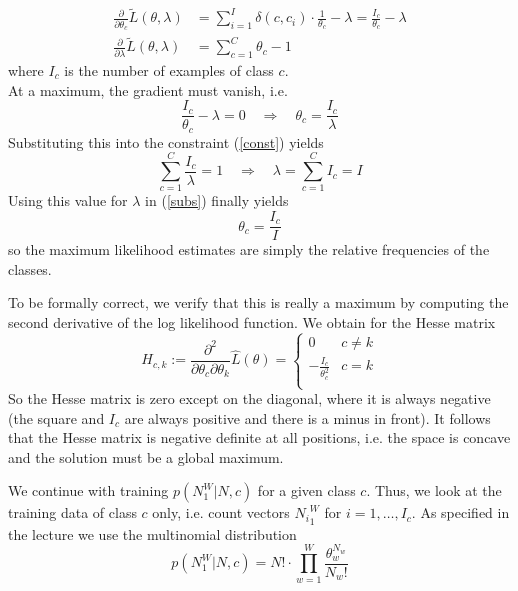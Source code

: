 \documentclass[%
   11pt,              %
   ngerman,           %
   a4paper,           %
   DIV11,             %
]{scrartcl}%
\begin{document}
\begin{align*}
	\frac{\partial}{\partial \theta_c} \tilde{L}(\theta, \lambda) &= \sum_{i=1}^I \delta(c,c_i) \cdot \frac{1}{\theta_c} - \lambda = \frac{I_c}{\theta_c} - \lambda \\
	\frac{\partial}{\partial \lambda} \tilde{L}(\theta, \lambda) &= \sum_{c=1}^C \theta_c - 1
\end{align*}
where $I_c$ is the number of examples of class $c$. \\
At a maximum, the gradient must vanish, i.e.
\begin{equation}\label{subs}
	\frac{I_c}{\theta_c} - \lambda = 0 \quad \Rightarrow \quad \theta_c = \frac{I_c}{\lambda}
\end{equation}
Substituting this into the constraint (\ref{const}) yields
\begin{equation*}
	\sum_{c=1}^C \frac{I_c}{\lambda} = 1 \quad \Rightarrow \quad \lambda = \sum_{c=1}^C I_c = I
\end{equation*}
Using this value for $\lambda$ in (\ref{subs}) finally yields
\begin{equation*}
	\theta_c = \frac{I_c}{I}
\end{equation*}
so the maximum likelihood estimates are simply the relative frequencies of the classes. \par
To be formally correct, we verify that this is really a maximum by computing the second derivative of the log likelihood function. We obtain for the Hesse matrix
\begin{equation*}
	H_{c,k} := \frac{\partial^2}{\partial \theta_c \partial \theta_k} \hat{L}(\theta) = \begin{cases}
	0 & c \neq k \\
	- \frac{I_c}{\theta_c^2} & c = k \\ \end{cases}
\end{equation*}
So the Hesse matrix is zero except on the diagonal, where it is always negative (the square and $I_c$ are always positive and there is a minus in front). It follows that the Hesse matrix is negative definite at all positions, i.e. the space is concave and the solution must be a global maximum. \par
We continue with training $p(N_1^W|N,c)$ for a given class $c$. Thus, we look at the training data of class $c$ only, i.e. count vectors ${N_i}_1^W$ for $i = 1,\ldots,I_c$. As specified in the lecture we use the multinomial distribution
\begin{equation*}
	p(N_1^W|N,c) = N! \cdot \prod_{w=1}^W \frac{\theta_w^{N_w}}{N_w !}
\end{equation*}
\end{document}
